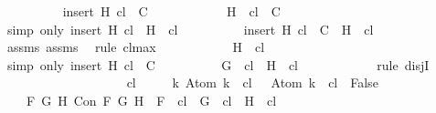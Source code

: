 \begin{isabellebody}
\ \ \ \ \ \ \ \ \isamarkupfalse%
\ {\isachardoublequoteopen}insert\ H\ {\isacharquery}cl\ {\isasymin}\ C{\isachardoublequoteclose}\isanewline
\ \ \ \ \ \ \ \ \ \ \isamarkupfalse%
\ {\isacartoucheopen}{\isacharbraceleft}H{\isacharbraceright}\ {\isasymunion}\ {\isacharquery}cl\ {\isasymin}\ C{\isacartoucheclose}\ \isamarkupfalse%
\ {\isacharparenleft}simp\ only{\isacharcolon}\ {\isacartoucheopen}insert\ H\ {\isacharquery}cl\ {\isacharequal}\ {\isacharbraceleft}H{\isacharbraceright}\ {\isasymunion}\ {\isacharquery}cl{\isacartoucheclose}{\isacharparenright}\isanewline
\ \ \ \ \ \ \ \ \isamarkupfalse%
\ {\isachardoublequoteopen}insert\ H\ {\isacharquery}cl\ {\isasymin}\ C\ {\isasymLongrightarrow}\ H\ {\isasymin}\ {\isacharquery}cl{\isachardoublequoteclose}\isanewline
\ \ \ \ \ \ \ \ \ \ \isamarkupfalse%
\ assms{\isacharparenleft}{}{\isacharparenright}\ assms{\isacharparenleft}{}{\isacharparenright}\ \isamarkupfalse%
\ {\isacharparenleft}rule\ cl{\isacharunderscore}max{\isacharprime}{\isacharparenright}\isanewline
\ \ \ \ \ \ \ \ \isamarkupfalse%
\ \isamarkupfalse%
\ {\isachardoublequoteopen}H\ {\isasymin}\ {\isacharquery}cl{\isachardoublequoteclose}\isanewline
\ \ \ \ \ \ \ \ \ \ \isamarkupfalse%
\ {\isacharparenleft}simp\ only{\isacharcolon}\ {\isacartoucheopen}insert\ H\ {\isacharquery}cl\ {\isasymin}\ C{\isacartoucheclose}{\isacharparenright}\isanewline
\ \ \ \ \ \ \ \ \isamarkupfalse%
\ {\isachardoublequoteopen}G\ {\isasymin}\ {\isacharquery}cl\ {\isasymor}\ H\ {\isasymin}\ {\isacharquery}cl{\isachardoublequoteclose}\isanewline
\ \ \ \ \ \ \ \ \ \ \isamarkupfalse%
\ {\isacharparenleft}rule\ disjI{}{\isacharparenright}\isanewline
\ \ \ \ \ \ \isamarkupfalse%
\isanewline
\ \ \ \ \isamarkupfalse%
\isanewline
\ \ \isamarkupfalse%
\isanewline
\ \ \isamarkupfalse%
\ {\isachardoublequoteopen}{\isasymbottom}\ {\isasymnotin}\ {\isacharquery}cl\ {\isasymand}\isanewline
\ \ \ \ {\isacharparenleft}{\isasymforall}k{\isachardot}\ Atom\ k\ {\isasymin}\ {\isacharquery}cl\ {\isasymlongrightarrow}\ \isactrlbold {\isasymnot}\ {\isacharparenleft}Atom\ k{\isacharparenright}\ {\isasymin}\ {\isacharquery}cl\ {\isasymlongrightarrow}\ False{\isacharparenright}\ {\isasymand}\isanewline
\ \ \ \ {\isacharparenleft}{\isasymforall}F\ G\ H{\isachardot}\ Con\ F\ G\ H\ {\isasymlongrightarrow}\ F\ {\isasymin}\ {\isacharquery}cl\ {\isasymlongrightarrow}\ G\ {\isasymin}\ {\isacharquery}cl\ {\isasymand}\ H\ {\isasymin}\ {\isacharquery}cl{\isacharparenright}\ {\isasymand}\isanewline

\end{isabellebody}
